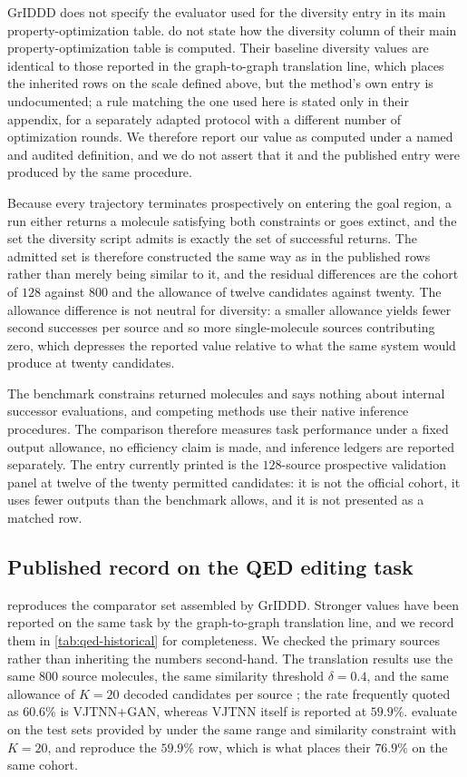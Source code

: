 GrIDDD does not specify the evaluator used for the diversity entry in its main property-optimization table. \citet{ninniri2025griddd} do not state how the diversity column of their main property-optimization table is computed. Their baseline diversity values are identical to those reported in the graph-to-graph translation line, which places the inherited rows on the scale defined above, but the method's own entry is undocumented; a rule matching the one used here is stated only in their appendix, for a separately adapted protocol with a different number of optimization rounds. We therefore report our value as computed under a named and audited definition, and we do not assert that it and the published entry were produced by the same procedure.

Because every \method{} trajectory terminates prospectively on entering the goal region, a run either returns a molecule satisfying both constraints or goes extinct, and the set the diversity script admits is exactly the set of successful returns. The admitted set is therefore constructed the same way as in the published rows rather than merely being similar to it, and the residual differences are the cohort of $128$ against $800$ and the allowance of twelve candidates against twenty. The allowance difference is not neutral for diversity: a smaller allowance yields fewer second successes per source and so more single-molecule sources contributing zero, which depresses the reported value relative to what the same system would produce at twenty candidates.

The benchmark constrains returned molecules and says nothing about internal successor evaluations, and competing methods use their native inference procedures. The comparison therefore measures task performance under a fixed output allowance, no efficiency claim is made, and inference ledgers are reported separately. The entry currently printed is the $128$-source prospective validation panel at twelve of the twenty permitted candidates: it is not the official cohort, it uses fewer outputs than the benchmark allows, and it is not presented as a matched row.

\subsection{Published record on the {QED} editing task}
\label{app:qed-historical}

 reproduces the comparator set assembled by GrIDDD. Stronger values have been reported on the same task by the graph-to-graph translation line, and we record them in \cref{tab:qed-historical} for completeness. We checked the primary sources rather than inheriting the numbers second-hand. The translation results use the same $800$ source molecules, the same similarity threshold $\delta=0.4$, and the same allowance of $K=20$ decoded candidates per source \citep{jin2019vjtnn}; the rate frequently quoted as $60.6\%$ is VJTNN+GAN, whereas VJTNN itself is reported at $59.9\%$. \citet{jin2020hierg2g} evaluate on the test sets provided by \citet{jin2019vjtnn} under the same range and similarity constraint with $K=20$, and reproduce the $59.9\%$ row, which is what places their $76.9\%$ on the same cohort.

